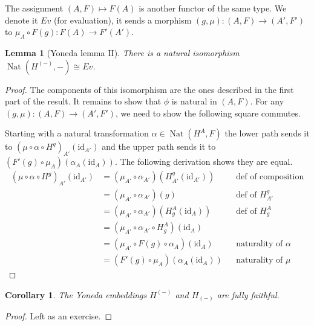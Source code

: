 \documentclass{article}
\newtheorem{cor}[thm]{Corollary}
\newtheorem{lem}[thm]{Lemma}
\theoremstyle{definition}
\theoremstyle{remark}
\DeclareMathOperator{\Nat}{Nat}
\newcommand{\id}{\text{id}}
\begin{document}
The assignment $(A,F) \mapsto F(A)$ is another functor of the same type. We denote it $Ev$ (for evaluation), it sends a morphism $(g,\mu): (A,F) \rightarrow (A',F')$ to $\mu_A \circ F(g):F(A) \rightarrow F'(A')$.

\begin{lem}[Yoneda lemma II]
	There is a natural isomorphism $\Nat(H^{(-)}, -) \cong Ev$.
\end{lem}
\begin{proof}
	The components of this isomorphism are the ones described in the first part of the result. It remains to show that $\phi$ is natural in $(A,F)$. For any $(g, \mu): (A,F) \rightarrow (A',F')$, we need to show the following square commutes.
	\begin{figure}[H]
		\centering
	\end{figure}

	Starting with a natural transformation $\alpha \in \Nat(H^A,F)$ the lower path sends it to $(\mu\circ \alpha \circ H^g)_{A'}(\id_{A'})$ and the upper path sends it to $(F'(g) \circ \mu_A)(\alpha_A(\id_A))$. The following derivation shows they are equal.
	\begin{align*}
		(\mu\circ \alpha \circ H^g)_{A'}(\id_{A'}) &= (\mu_{A'}\circ \alpha_{A'})(H^g_{A'}(\id_{A'}))&&\mbox{def of composition}\\
		&= (\mu_{A'}\circ \alpha_{A'})(g)&&\mbox{def of $H^g_{A'}$}\\
		&= (\mu_{A'}\circ \alpha_{A'})(H^A_g(\id_A))&&\mbox{def of $H^A_g$}\\
		&= (\mu_{A'}\circ \alpha_{A'} \circ H^A_g)(\id_A)\\
		&= (\mu_{A'} \circ F(g) \circ \alpha_A)(\id_A)&&\mbox{naturality of $\alpha$}\\
		&=(F'(g) \circ \mu_A)(\alpha_A(\id_A)) &&\mbox{naturality of $\mu$}
	\end{align*}
\end{proof}

\begin{cor}
	The Yoneda embeddings $H^{(-)}$ and $H_{(-)}$ are fully faithful.
\end{cor}
\begin{proof}
	Left as an exercise.
\end{proof}
\end{document}
